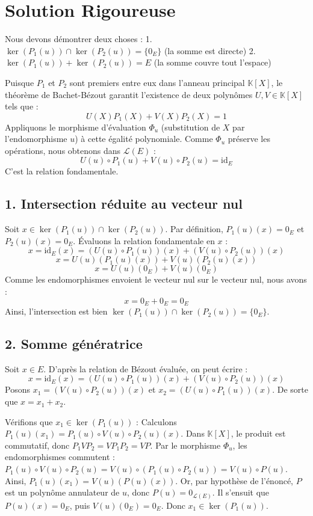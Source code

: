 \documentclass[11pt,a4paper]{article}
\begin{document}
\section{Solution Rigoureuse}

Nous devons démontrer deux choses :
1. $\ker(P_1(u)) \cap \ker(P_2(u)) = \{0_E\}$ (la somme est directe)
2. $\ker(P_1(u)) + \ker(P_2(u)) = E$ (la somme couvre tout l'espace)

Puisque $P_1$ et $P_2$ sont premiers entre eux dans l'anneau principal $\mathbb{K}[X]$, le théorème de Bachet-Bézout garantit l'existence de deux polynômes $U, V \in \mathbb{K}[X]$ tels que :
$$U(X) P_1(X) + V(X) P_2(X) = 1$$
Appliquons le morphisme d'évaluation $\Phi_u$ (substitution de $X$ par l'endomorphisme $u$) à cette égalité polynomiale. Comme $\Phi_u$ préserve les opérations, nous obtenons dans $\mathcal{L}(E)$ :
$$U(u) \circ P_1(u) + V(u) \circ P_2(u) = \text{id}_E$$
C'est la relation fondamentale.

\subsection{1. Intersection réduite au vecteur nul}
Soit $x \in \ker(P_1(u)) \cap \ker(P_2(u))$.
Par définition, $P_1(u)(x) = 0_E$ et $P_2(u)(x) = 0_E$.
Évaluons la relation fondamentale en $x$ :
$$x = \text{id}_E(x) = (U(u) \circ P_1(u))(x) + (V(u) \circ P_2(u))(x)$$
$$x = U(u)(P_1(u)(x)) + V(u)(P_2(u)(x))$$
$$x = U(u)(0_E) + V(u)(0_E)$$
Comme les endomorphismes envoient le vecteur nul sur le vecteur nul, nous avons :
$$x = 0_E + 0_E = 0_E$$
Ainsi, l'intersection est bien $\ker(P_1(u)) \cap \ker(P_2(u)) = \{0_E\}$.

\subsection{2. Somme génératrice}
Soit $x \in E$. D'après la relation de Bézout évaluée, on peut écrire :
$$x = \text{id}_E(x) = (U(u) \circ P_1(u))(x) + (V(u) \circ P_2(u))(x)$$
Posons $x_1 = (V(u) \circ P_2(u))(x)$ et $x_2 = (U(u) \circ P_1(u))(x)$.
De sorte que $x = x_1 + x_2$.

Vérifions que $x_1 \in \ker(P_1(u))$ :
Calculons $P_1(u)(x_1) = P_1(u) \circ V(u) \circ P_2(u) (x)$.
Dans $\mathbb{K}[X]$, le produit est commutatif, donc $P_1 V P_2 = V P_1 P_2 = V P$.
Par le morphisme $\Phi_u$, les endomorphismes commutent : $P_1(u) \circ V(u) \circ P_2(u) = V(u) \circ (P_1(u) \circ P_2(u)) = V(u) \circ P(u)$.
Ainsi, $P_1(u)(x_1) = V(u)(P(u)(x))$.
Or, par hypothèse de l'énoncé, $P$ est un polynôme annulateur de $u$, donc $P(u) = 0_{\mathcal{L}(E)}$.
Il s'ensuit que $P(u)(x) = 0_E$, puis $V(u)(0_E) = 0_E$.
Donc $x_1 \in \ker(P_1(u))$.
\end{document}
